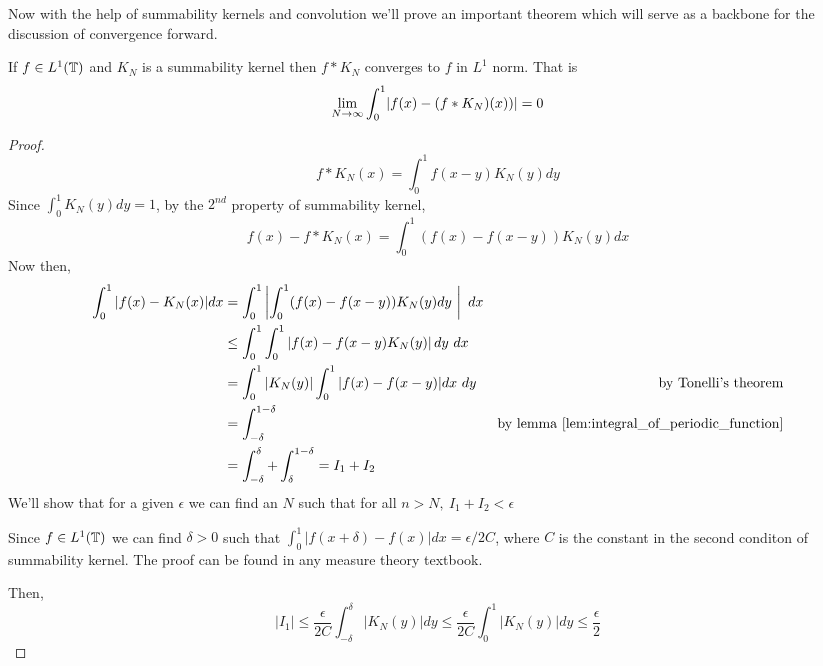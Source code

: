   Now with the help of summability kernels and convolution we'll prove an important theorem which will serve as a backbone for the discussion of convergence forward.
  \begin{theorem}
    \label{thm:L1_convergence_of_summability_kernel}
    If $f\in L^1(\mathbb T)$ and $K_N$ is a summability kernel then $f*K_N$ converges to $f$ in $L^1$ norm. That is
    \begin{displaymath}
      \lim_{N\to \infty} \int_{0}^{1}\lvert f(x) - (f*K_N)(x))\rvert = 0
    \end{displaymath}
\end{theorem}
  \begin{proof}
    \begin{displaymath}
      f*K_N(x) = \int_0^1 f(x-y)K_N(y)dy
    \end{displaymath}
    Since $\int_0^1 K_N(y)dy = 1$, by the $2^{nd}$ property of summability kernel,
    \begin{displaymath}
      f(x) - f*K_N(x) = \int_0^1\left(f(x)-f(x-y)\right)K_N(y)dx
    \end{displaymath}
    Now then, 
    \begin{align*}
      \int_0^1 |f(x) - K_N(x)| dx &= \int_0^1 \left| \int_0^1 (f(x) - f(x-y))K_N(y)dy \ \right| \ dx \\
                &\le \int_0^1 \int_0^1 \left| f(x) - f(x-y) K_N(y) \right| dy \ dx \\
                &= \int_0^1 |K_N(y)| \int_0^1 |f(x) - f(x-y)| dx \ dy & \text{by Tonelli's theorem} \\
                &= \int_{-\delta}^{1-\delta} & \text{by lemma } \ref{lem:integral_of_periodic_function}\\
                &= \int_{-\delta}^{\delta} + \int_{\delta}^{1-\delta} = I_1 + I_2\\
    \end{align*}
    We'll show that for a given $\epsilon$ we can find an $N$ such that for all $n>N, \ I_1+I_2 < \epsilon$

    Since $f \in L^1(\mathbb T)$ we can find $\delta >0$ such that $\int_0^1| f(x+\delta) - f(x) | dx = \epsilon / 2C$, where $C$ is the constant in the second conditon of summability kernel. The proof can be found in any measure theory textbook.
    
    Then, 
    \begin{displaymath}
      |I_1| \le \frac{\epsilon}{2C} \int_{-\delta}^{\delta}|K_N(y)|dy \le \frac{\epsilon}{2C} \int_0^1 |K_N(y)| dy \le \frac{\epsilon}{2}
    \end{displaymath}  
    

\end{proof}
